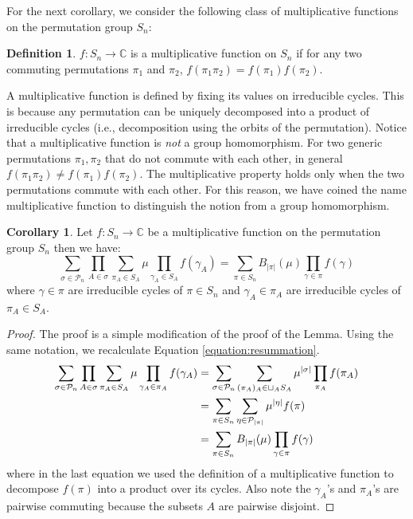 \documentclass[a4paper,11pt]{article}
\theoremstyle{definition}
\newtheorem{definition}{Definition}[section]
\numberwithin{equation}{section}
\newtheorem{corollary}[lemma]{Corollary}
\begin{document}
For the next corollary, we consider the following class of multiplicative functions on the permutation group $S_n$:
\begin{definition}
    $f:S_n\rightarrow\mathbb{C}$ is a multiplicative function on $S_n$ if for any two commuting permutations $\pi_1$ and $\pi_2$, $f(\pi_1\pi_2) = f(\pi_1)f(\pi_2)$.
\end{definition}
A multiplicative function is defined by fixing its values on irreducible cycles. This is because any permutation can be uniquely decomposed into a product of irreducible cycles (i.e., decomposition using the orbits of the permutation). Notice that a multiplicative function is \textit{not} a group homomorphism. For two generic permutations $\pi_1,\pi_2$ that do not commute with each other, in general $f(\pi_1\pi_2) \neq f(\pi_1)f(\pi_2)$. The multiplicative property holds only when the two permutations commute with each other. For this reason, we have coined the name multiplicative function to distinguish the notion from a group homomorphism.
\begin{corollary}
    Let $f:S_n\rightarrow\mathbb{C}$ be a multiplicative function on the permutation group $S_n$ then we have:
    \begin{equation}
        \sum_{\sigma\in\mathcal{P}_n}\prod_{A\in\sigma}\sum_{\pi_A\in S_{A}}\mu \prod_{\gamma_A\in S_A}f(\gamma_A) = \sum_{\pi\in S_n}B_{|\pi|}(\mu)\prod_{\gamma\in\pi}f(\gamma)
    \end{equation}
    where $\gamma\in\pi$ are irreducible cycles of $\pi\in S_n$ and $\gamma_A\in\pi_A$ are irreducible cycles of $\pi_A\in S_A$.
\end{corollary}
\begin{proof}
    The proof is a simple modification of the proof of the Lemma. Using the same notation, we recalculate Equation \ref{equation:resummation}. 
    \begin{align}
        \begin{split}
            \sum_{\sigma\in\mathcal{P}_n}\prod_{A\in\sigma}\sum_{\pi_A\in S_{A}}\mu\prod_{\gamma_A\in\pi_A}f(\gamma_A) &=\sum_{\sigma\in\mathcal{P}_n}\sum_{(\pi_A)_A\in\sqcup_A S_{A}}\mu^{|\sigma|}\prod_{\pi_A}f(\pi_A)
            \\&
            =\sum_{\pi\in S_n}\sum_{\eta\in\mathcal{P}_{|\pi|}}\mu^{|\eta|}f(\pi)
            \\&
            =\sum_{\pi\in S_n}B_{|\pi|}(\mu)\prod_{\gamma\in\pi}f(\gamma)\qedhere
        \end{split}
    \end{align}
    where in the last equation we used the definition of a multiplicative function to decompose $f(\pi)$ into a product over its cycles. Also note the $\gamma_A$'s and $\pi_A$'s are pairwise commuting because the subsets $A$ are pairwise disjoint.
\end{proof}
\end{document}
